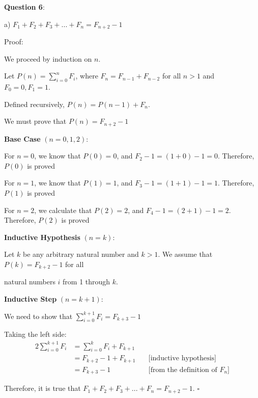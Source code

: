 \documentclass{article} %
\newcommand{\question}[2][]{\begin{flushleft}
        \textbf{Question #1}: #2

\end{flushleft}}
\begin{document}
    \question[6]{}

    a) $F_1 + F_2 + F_3 + ... + F_n = F_{n + 2} - 1$

    Proof: 
    
    We proceed by induction on $n$.

    Let $P(n) = \sum_{i = 0}^{n} F_i$, where $F_n = F_{n - 1} + F_{n - 2}$ for all $n > 1$ and $F_0 = 0, F_1 = 1$.

    Defined recursively, $P(n) = P(n - 1) + F_n$.

    We must prove that $P(n) = F_{n + 2} - 1$

    \textbf{Base Case} $(n = 0, 1, 2)$:

    For $n = 0$, we know that $P(0) = 0$, and $F_2 - 1 = (1 + 0) - 1 = 0$. Therefore, $P(0)$ is proved

    For $n = 1$, we know that $P(1) = 1$, and $F_3 - 1 = (1 + 1) - 1 = 1$. Therefore, $P(1)$ is proved

    For $n = 2$, we calculate that $P(2) = 2$, and $F_4 - 1 = (2 + 1) - 1 = 2$. Therefore, $P(2)$ is proved

    \textbf{Inductive Hypothesis} $(n = k)$:

    Let $k$ be any arbitrary natural number and $k > 1$. We assume that $P(k) = F_{k+2} - 1$ for all
    
    natural numbers $i$ from 1 through $k$.

    \textbf{Inductive Step} $(n = k+1)$:

    We need to show that $\sum_{i = 0}^{k+1} F_i = F_{k + 3} - 1$

    Taking the left side:
    \begin{alignat*}{2}
        \sum_{i = 0}^{k+1} F_i &= \sum_{i = 0}^{k} F_i + F_{k + 1}\\
        &= F_{k + 2} - 1 + F_{k + 1}\ &&\text{[inductive hypothesis]}\\
        &= F_{k + 3} - 1 &&\text{[from the definition of $F_n$]}
    \end{alignat*}
    
    Therefore, it is true that $F_1 + F_2 + F_3 + ... + F_n = F_{n + 2} - 1$. $\square$

    \newpage

                                                                           
\end{document}
